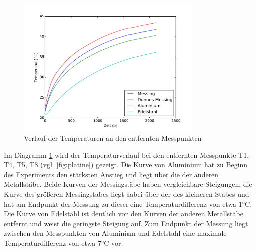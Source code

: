 \begin{figure}[p]
	\label{fig:entftemp}
	\centering
	\includegraphics[width=0.8\textwidth]{Bilder/M1_Tempverl.pdf}
	\caption{Verlauf der Temperaturen an den entfernten Messpunkten}
\end{figure}
Im Diagramm \ref{fig:entftemp} wird der Temperaturverlauf bei den entfernten Messpunkte T1, T4, T5, T8 (vgl. \ref{fig:platine}) gezeigt. 
Die Kurve von Aluminium hat zu Beginn des Experiments den stärksten Anstieg und liegt über die der anderen Metallstäbe. 
Beide Kurven der Messingstäbe haben vergleichbare Steigungen;
die Kurve des größeren Messingstabes liegt dabei über der des kleineren Stabes und hat am Endpunkt der Messung zu dieser eine Temperaturdifferenz von etwa $1 \si{\degreeCelsius}$. 
Die Kurve von Edelstahl ist deutlich von den Kurven der anderen Metallstäbe entfernt und weist die geringste Steigung auf. 
Zum Endpunkt der Messung liegt zwischen den Messpunkten von Aluminium und Edelstahl eine maximale Temperaturdifferenz von etwa $7 \si{\degreeCelsius}$ vor. 

